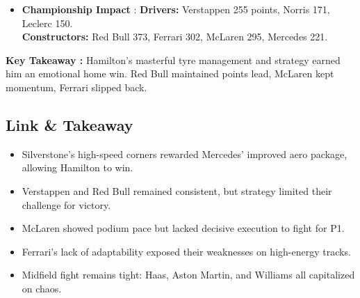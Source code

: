 \begin{itemize}
    \item \textbf{Championship Impact} : \textbf{Drivers:} Verstappen 255 points, Norris 171, Leclerc 150.\\
    \textbf{Constructors:} Red Bull 373, Ferrari 302, McLaren 295, Mercedes 221.    
\end{itemize}

\textbf{Key Takeaway :}
Hamilton’s masterful tyre management and strategy earned him an emotional home win. Red Bull maintained points lead, McLaren kept momentum, Ferrari slipped back.


\subsection{Link \& Takeaway}

\begin{itemize}
    \item Silverstone’s high-speed corners rewarded Mercedes’ improved aero package, allowing Hamilton to win.
    \item Verstappen and Red Bull remained consistent, but strategy limited their challenge for victory.
    \item McLaren showed podium pace but lacked decisive execution to fight for P1.
    \item Ferrari’s lack of adaptability exposed their weaknesses on high-energy tracks.
    \item Midfield fight remains tight: Haas, Aston Martin, and Williams all capitalized on chaos. 
\end{itemize}